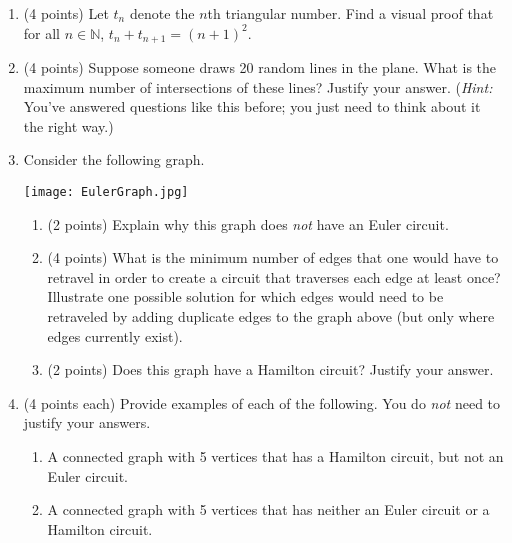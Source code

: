 \documentclass[11pt]{article}
\theoremstyle{definition}
\begin{document}
\begin{enumerate}

\item (4 points) Let $t_n$ denote the $n$th triangular number.  Find a visual proof that for all $n\in\mathbb{N}$, $t_n+t_{n+1}=(n+1)^2$.

\item (4 points) Suppose someone draws 20 random lines in the plane.  What is the maximum number of intersections of these lines?  Justify your answer.  (\emph{Hint:}  You've answered questions like this before; you just need to think about it the right way.)

\item Consider the following graph.
\begin{multicols}{2}

\begin{center}
\texttt{[image: EulerGraph.jpg]}
\end{center}

\begin{enumerate}
\item (2 points) Explain why this graph does \emph{not} have an Euler circuit.

\item (4 points) What is the minimum number of edges that one would have to retravel in order to create a circuit that traverses each edge at least once?  Illustrate one possible solution for which edges would need to be retraveled by adding duplicate edges to the graph above (but only where edges currently exist).

\item (2 points) Does this graph have a Hamilton circuit?  Justify your answer.

\end{enumerate}

\end{multicols}

\item (4 points each)  Provide examples of each of the following.  You do \emph{not} need to justify your answers.

\begin{enumerate}

\item A connected graph with 5 vertices that has a Hamilton circuit, but not an Euler circuit.

\item A connected graph with 5 vertices that has neither an Euler circuit or a Hamilton circuit.


\end{enumerate}
\end{enumerate}
\end{document}
